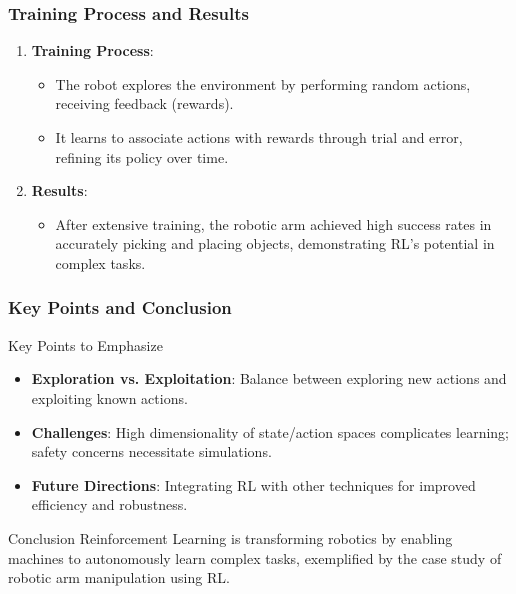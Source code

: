 \documentclass[aspectratio=169]{beamer}
\begin{document}
\begin{frame}[fragile]
    \frametitle{Training Process and Results}
    \begin{enumerate}[resume]
        \item \textbf{Training Process}:
            \begin{itemize}
                \item The robot explores the environment by performing random actions, receiving feedback (rewards).
                \item It learns to associate actions with rewards through trial and error, refining its policy over time.
            \end{itemize}
        
        \item \textbf{Results}:
            \begin{itemize}
                \item After extensive training, the robotic arm achieved high success rates in accurately picking and placing objects, demonstrating RL's potential in complex tasks.
            \end{itemize}
    \end{enumerate}
\end{frame}

\begin{frame}[fragile]
    \frametitle{Key Points and Conclusion}
    \begin{block}{Key Points to Emphasize}
        \begin{itemize}
            \item \textbf{Exploration vs. Exploitation}: Balance between exploring new actions and exploiting known actions.
            \item \textbf{Challenges}: High dimensionality of state/action spaces complicates learning; safety concerns necessitate simulations.
            \item \textbf{Future Directions}: Integrating RL with other techniques for improved efficiency and robustness.
        \end{itemize}
    \end{block}
    
    \begin{block}{Conclusion}
        Reinforcement Learning is transforming robotics by enabling machines to autonomously learn complex tasks, exemplified by the case study of robotic arm manipulation using RL.
    \end{block}
\end{frame}
\end{document}

